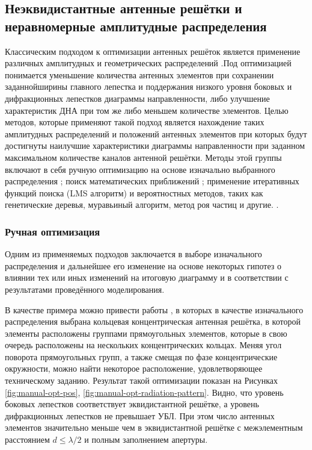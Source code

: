 \subsection{Неэквидистантные антенные решётки и неравномерные амплитудные распределения}\label{sect:distributions-theory}


Классическим подходом к оптимизации антенных решёток является применение различных амплитудных и геометрических
распределений \cite{harrington1961sidelobe, ma1963note, brown1962note}.Под оптимизацией понимается уменьшение
количества антенных элементов при сохранении заданнойширины главного лепестка и поддержания низкого уровня
боковых и дифракционных лепестков диаграммы направленности, либо улучшение
характеристик ДНА при том же либо меньшем количестве элементов.
Целью методов, которые применяют такой подход является нахождение таких амплитудных распределений и положений
антенных элементов при которых будут достигнуты наилучшие характеристики диаграммы направленности при
заданном максимальном количестве каналов антенной решётки. Методы этой группы включают в себя ручную
оптимизацию на основе изначально выбранного распределения \cite{lyalin2019, kuzmin2019ring, andreasen1962linear};
поиск математических приближений \cite{ishimaru1962theory, harrington1961sidelobe};
применение итеративных функций поиска (LMS алгоритм)\cite{ma1997weighted} и вероятностных методов,
таких как генетические деревья, муравьиный алгоритм, метод роя частиц и другие.
\cite{jain2012solving, dubey2023cosecant, luo2015synthesis}.

\subsubsection{Ручная оптимизация}\label{sec:manual-optimization}

Одним из применяемых подходов заключается в выборе изначального распределения и дальнейшее его изменение
на основе некоторых гипотез о влиянии тех или иных изменений на итоговую диаграмму и в
соответствии с результатами проведённого моделирования.

В качестве примера можно привести работы \cite{lyalin2019, kuzmin2019ring}, в которых в качестве
изначального распределения выбрана кольцевая концентрическая антенная решётка, в которой элементы
расположены группами прямоугольных элементов, которые в свою очередь расположены на нескольких
концентрических кольцах. Меняя угол поворота прямоугольных групп, а также смещая по фазе концентрические
окружности, можно найти некоторое расположение, удовлетворяющее техническому заданию.
Результат такой оптимизации показан на Рисунках \ref{fig:manual-opt-pos}, \ref{fig:manual-opt-radiation-pattern}.
Видно, что уровень боковых лепестков соответствует эквидистантной решётке, а уровень
дифракционных лепестков не превышает УБЛ. При этом число антенных элементов
значительно меньше чем в эквидистантной решётке с межэлементным расстоянием $d \leq \lambda/2$ и полным заполнением апертуры.

